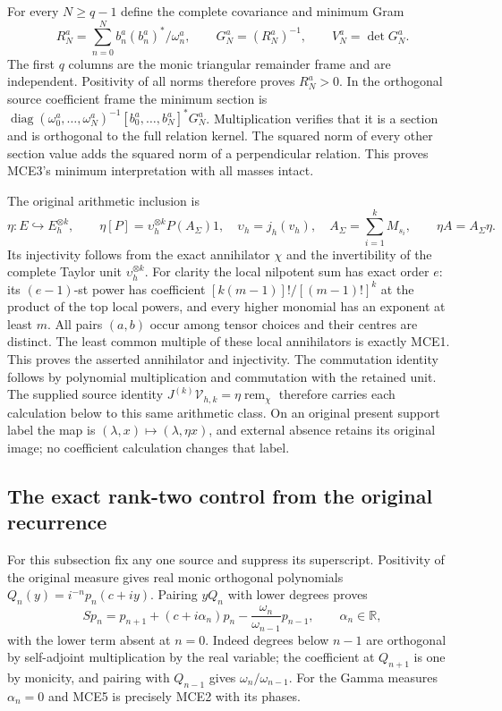 \documentclass[11pt,a4paper]{article}
\begin{document}
For every $N\ge q-1$ define the complete covariance and minimum Gram
\[
 R_N^a=\sum_{n=0}^N b_n^a(b_n^a)^*/\omega_n^a,
 \qquad G_N^a=(R_N^a)^{-1},\qquad V_N^a=\det G_N^a.
 \tag{MCE3}
\]
The first $q$ columns are the monic triangular remainder frame and
are independent. Positivity of all norms therefore proves $R_N^a>0$.
In the orthogonal source coefficient frame the minimum section is
$\operatorname{diag}(\omega_0^a,\ldots,\omega_N^a)^{-1}
[b_0^a,\ldots,b_N^a]^*G_N^a$.
Multiplication verifies that it is a section and is orthogonal to
the full relation kernel. The squared norm of every other section
value adds the squared norm of a perpendicular relation. This proves
MCE3's minimum interpretation with all masses intact.

The original arithmetic inclusion is
\[
 \eta:E\hookrightarrow E_h^{\otimes k},\qquad
 \eta[P]=\upsilon_h^{\otimes k}P(A_\Sigma)1,
 \quad\upsilon_h=j_h(v_h),\quad A_\Sigma=\sum_{i=1}^kM_{s_i},
 \qquad \eta A=A_\Sigma\eta.
 \tag{MCE4}
\]
Its injectivity follows from the exact annihilator $\chi$ and the
invertibility of the complete Taylor unit $\upsilon_h^{\otimes k}$.
For clarity the local nilpotent sum has exact order $e$: its
$(e-1)$-st power has coefficient
$[k(m-1)]!/[(m-1)!]^k$ at the product of the top local powers,
and every higher monomial has an exponent at least $m$. All pairs
$(a,b)$ occur among tensor choices and their centres are distinct.
The least common multiple of these local annihilators is exactly
MCE1. This proves the asserted annihilator and injectivity.
The commutation identity follows by polynomial multiplication and
commutation with the retained unit. The supplied source identity
$J^{(k)}\mathcal V_{h,k}=\eta\operatorname{rem}_\chi$ therefore
carries each calculation below to this same arithmetic class.
On an original present support label the map is
$(\lambda,x)\mapsto(\lambda,\eta x)$, and external absence retains
its original image; no coefficient calculation changes that label.

\subsection{The exact rank-two control from the original recurrence}
For this subsection fix any one source and suppress its superscript.
Positivity of the original measure gives real monic orthogonal
polynomials $Q_n(y)=i^{-n}p_n(c+iy)$. Pairing $yQ_n$ with lower
degrees proves
\[
 Sp_n=p_{n+1}+(c+i\alpha_n)p_n
             -\frac{\omega_n}{\omega_{n-1}}p_{n-1},\qquad
 \alpha_n\in\mathbb R,
 \tag{MCE5}
\]
with the lower term absent at $n=0$. Indeed degrees below $n-1$
are orthogonal by self-adjoint multiplication by the real variable;
the coefficient at $Q_{n+1}$ is one by monicity, and pairing with
$Q_{n-1}$ gives $\omega_n/\omega_{n-1}$. For the Gamma measures
$\alpha_n=0$ and MCE5 is precisely MCE2 with its phases.
\end{document}
